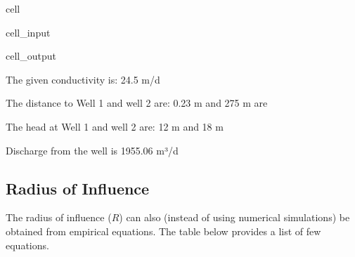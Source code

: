 \documentclass[letterpaper,10pt,english]{jupyterBook}
\begin{document}
\begin{sphinxuseclass}{cell}
\begin{sphinxVerbatimInput}
\begin{sphinxuseclass}{cell_input}
\begin{sphinxVerbatim}[commandchars=\\\{\}]
\PYG{l+s+s2}{[1m Result:}\PYG{l+s+s2}{[0m}
\end{sphinxVerbatim}

\end{sphinxuseclass}\end{sphinxVerbatimInput}
\begin{sphinxVerbatimOutput}

\begin{sphinxuseclass}{cell_output}
\begin{sphinxVerbatim}[commandchars=\\\{\}]

 The given conductivity is: 24.5 m/d 

 The distance to Well 1 and well 2 are: 0.23 m and 275 m are 

 The head at Well 1 and well 2 are: 12 m and 18 m


Discharge from the well is 1955.06 m³/d
\end{sphinxVerbatim}

\end{sphinxuseclass}\end{sphinxVerbatimOutput}

\end{sphinxuseclass}

\subsection{Radius of Influence}
\label{\detokenize{content/flow/L8/18_wells:radius-of-influence}}
\sphinxAtStartPar
The radius of influence (\(R\)) can also (instead of using numerical simulations) be obtained from empirical equations. The table below provides a list of few equations.
\end{document}
